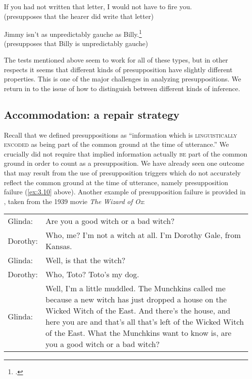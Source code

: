    \ex If you had not written that letter, I would not have to fire you.\\
  (presupposes that the hearer did write that letter) 

  \ex Jimmy isn’t as unpredictably gauche as Billy.\footnote{\citet[183]{Levinson1983}.}\\
  (presupposes that Billy is unpredictably gauche)
                       \z
                       \z


The tests mentioned above seem to work for all of these types, but in other respects it seems that different kinds of presupposition have slightly different properties. This is one of the major challenges in analyzing presuppositions. We return in  to the issue of how to distinguish between different kinds of inference.


\subsection{Accommodation: a repair strategy}\label{sec:3.4.2}

Recall that we defined presuppositions as “information which is \textsc{linguistically encoded} as being part of the common ground at the time of utterance.” We crucially did not require that implied information actually \textsc{be} part of the common ground in order to count as a presupposition. We have already seen one outcome that may result from the use of presupposition triggers which do not accurately reflect the common ground at the time of utterance, namely presupposition failure (\ref{ex:3.10} above). Another example of presupposition failure is provided in , taken from the 1939 movie \textit{The Wizard of Oz}:

\ea \label{ex:3.15}\begin{tabular}[t]{lp{9.25cm}} 
Glinda: & Are you a good witch or a bad witch?\\
Dorothy: & Who, me?  I’m not a witch at all.  I’m Dorothy Gale, from Kansas.\\
Glinda: & Well, is that the witch?\\
Dorothy: & Who, Toto?  Toto’s my dog.\\
Glinda: & Well, I’m a little muddled. The Munchkins called me because a new witch has just dropped a house on the Wicked Witch of the East. And there’s the house, and here you are and that’s all that’s left of the Wicked Witch of the East. What the Munchkins want to know is, are you a good witch or a bad witch?
\end{tabular}
\z


